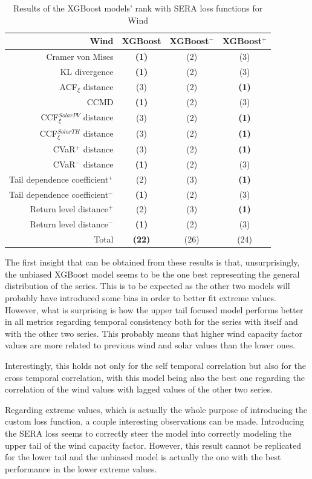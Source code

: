 \begin{table}[ht]
    \centering
    \footnotesize
    \begin{tabular}[r]{r|c|cc}
        \toprule
        \textbf{Wind}&XGBoost&XGBoost$^-$&XGBoost$^+$ \\
        \midrule            
        Cramer von Mises&\textbf{(1)}&(2)&(3) \\
        KL divergence&\textbf{(1)}&(2)&(3) \\
        ACF$_\xi$ distance&(3)&(2)&\textbf{(1)} \\
        \midrule
        CCMD&\textbf{(1)}&(2)&(3) \\
        CCF$_\xi^{Solar PV}$ distance&(3)&(2)&\textbf{(1)} \\
        CCF$_\xi^{Solar TH}$ distance&(3)&(2)&\textbf{(1)} \\
        \midrule
        CVaR$^+$ distance&(3)&(2)&\textbf{(1)} \\
        CVaR$^-$ distance&\textbf{(1)}&(2)&(3) \\
        Tail dependence coefficient$^+$&(2)&(3)&\textbf{(1)} \\
        Tail dependence coefficient$^-$&\textbf{(1)}&(2)&(3) \\
        Return level distance$^+$&(2)&(3)&\textbf{(1)} \\
        Return level distance$^-$&\textbf{(1)}&(2)&(3) \\
        \bottomrule
        Total&\textbf{(22)}&(26)&(24) \\
        \bottomrule
    \end{tabular}
    \caption{Results of the XGBoost models' rank with SERA loss functions for Wind\label{long}}
    \label{table:results-rank-custom-loss}
\end{table}

The first insight that can be obtained from these results is that, unsurprisingly, the unbiased XGBoost model seems to be the one best representing the general distribution of the series. This is to be expected as the other two models will probably have introduced some bias in order to better fit extreme values. However, what is surprising is how the upper tail focused model performs better in all metrics regarding temporal consistency both for the series with itself and with the other two series. This probably means that higher wind capacity factor values are more related to previous wind and solar values than the lower ones. 

Interestingly, this holds not only for the self temporal correlation but also for the cross temporal correlation, with this model being also the best one regarding the correlation of the wind values with lagged values of the other two series. 

Regarding extreme values, which is actually the whole purpose of introducing the custom loss function, a couple interesting observations can be made. Introducing the SERA loss seems to correctly steer the model into correctly modeling the upper tail of the wind capacity factor. However, this result cannot be replicated for the lower tail and the unbiased model is actually the one with the best performance in the lower extreme values. 